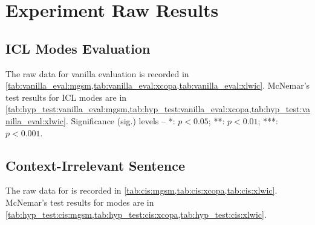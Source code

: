 \section{Experiment Raw Results} \label{app:expt}
\subsection{ICL Modes Evaluation} \label{app:expt:vanilla}


The raw data for vanilla evaluation is recorded in \cref{tab:vanilla_eval:mgsm,tab:vanilla_eval:xcopa,tab:vanilla_eval:xlwic}. McNemar's test results for ICL modes are in \cref{tab:hyp_test:vanilla_eval:mgsm,tab:hyp_test:vanilla_eval:xcopa,tab:hyp_test:vanilla_eval:xlwic}. Significance (sig.) levels -- *: $p<0.05$; **: $p<0.01$; ***: $p<0.001$.

\subsection{Context-Irrelevant Sentence} \label{app:expt:cis}

The raw data for \cis is recorded in \cref{tab:cis:mgsm,tab:cis:xcopa,tab:cis:xlwic}. McNemar's test results for \cis modes are in \cref{tab:hyp_test:cis:mgsm,tab:hyp_test:cis:xcopa,tab:hyp_test:cis:xlwic}. 


